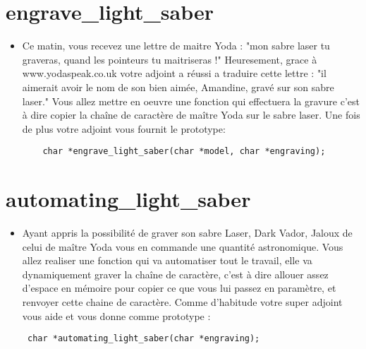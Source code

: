 \documentclass{koala-en}
\begin{document}
\newpage
\chapter{engrave\_light\_saber}


\begin{itemize}
  \item
Ce matin, vous recevez une lettre de maitre Yoda :
"mon sabre laser tu graveras, quand les pointeurs tu maitriseras !"
Heuresement, grace à www.yodaspeak.co.uk votre adjoint a réussi a traduire cette lettre :
"il aimerait avoir le nom de son bien aimée, Amandine, gravé sur son sabre laser."
Vous allez mettre en oeuvre une fonction qui effectuera la gravure c'est à dire copier la chaîne de caractère de maître Yoda sur le sabre laser.
Une fois de plus votre adjoint vous fournit le prototype:
\begin{lstlisting}
    char *engrave_light_saber(char *model, char *engraving); 
\end{lstlisting}
\end{itemize}

\newpage
\chapter{automating\_light\_saber}


\begin{itemize}
  \item
Ayant appris la possibilité de graver son sabre Laser, Dark Vador, Jaloux de celui de maître Yoda vous en commande une quantité astronomique.
Vous allez realiser une fonction qui va automatiser tout le travail, elle va dynamiquement graver la chaîne de caractère, c'est à dire allouer assez d'espace en mémoire pour copier ce que vous lui passez en paramètre, et renvoyer cette chaine de caractère. Comme d'habitude votre super adjoint vous aide
et vous donne comme prototype : 
\begin{lstlisting}
 char *automating_light_saber(char *engraving);
\end{lstlisting}
\end{itemize}
\newpage
\end{document}
